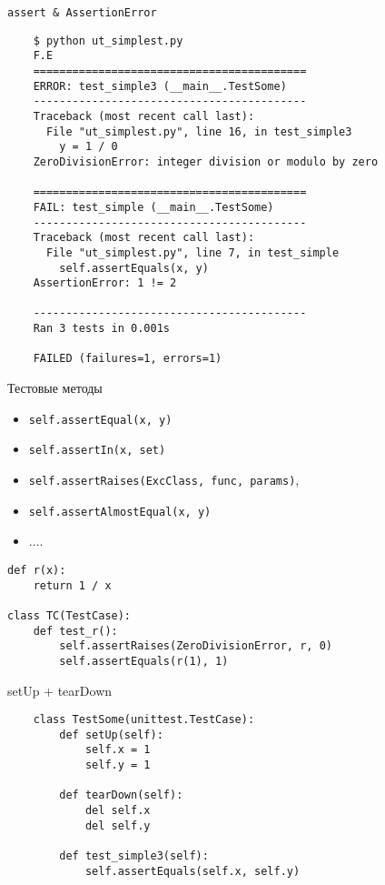 \documentclass{article}
\begin{document}
\begin{center}\lstinline!assert & AssertionError!\end{center}
\Large
\begin{verbatim}
	$ python ut_simplest.py
	F.E
	==========================================
	ERROR: test_simple3 (__main__.TestSome)
	------------------------------------------
	Traceback (most recent call last):
	  File "ut_simplest.py", line 16, in test_simple3
	    y = 1 / 0
	ZeroDivisionError: integer division or modulo by zero

	==========================================
	FAIL: test_simple (__main__.TestSome)
	------------------------------------------
	Traceback (most recent call last):
	  File "ut_simplest.py", line 7, in test_simple
	    self.assertEquals(x, y)
	AssertionError: 1 != 2

	------------------------------------------
	Ran 3 tests in 0.001s

	FAILED (failures=1, errors=1)
\end{verbatim}
\LARGE
\newpage

\begin{center}Тестовые методы\end{center}
\begin{itemize}
	\item \lstinline!self.assertEqual(x, y)!
	\item \lstinline!self.assertIn(x, set)!
	\item \lstinline!self.assertRaises(ExcClass, func, params)!, 
	\item \lstinline!self.assertAlmostEqual(x, y)!
	\item ....
\end{itemize}

\begin{lstlisting}
def r(x):
	return 1 / x

class TC(TestCase):
	def test_r():
		self.assertRaises(ZeroDivisionError, r, 0)
		self.assertEquals(r(1), 1)
\end{lstlisting}
\newpage

\begin{center}setUp + tearDown\end{center}
\begin{lstlisting}
	class TestSome(unittest.TestCase):
	    def setUp(self):
	        self.x = 1
	        self.y = 1

	    def tearDown(self):
	    	del self.x
	    	del self.y

	    def test_simple3(self):
	        self.assertEquals(self.x, self.y)
\end{lstlisting}
\newpage
\end{document}
